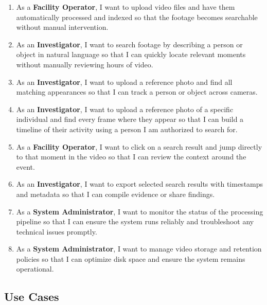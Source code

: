 \begin{enumerate}
    \item As a \textbf{Facility Operator}, I want to upload video files and have them automatically processed and indexed so that the footage becomes searchable without manual intervention.
    \item As an \textbf{Investigator}, I want to search footage by describing a person or object in natural language so that I can quickly locate relevant moments without manually reviewing hours of video.
    \item As an \textbf{Investigator}, I want to upload a reference photo and find all matching appearances so that I can track a person or object across cameras.
    \item As an \textbf{Investigator}, I want to upload a reference photo of a specific individual and find every frame where they appear so that I can build a timeline of their activity using a person I am authorized to search for.
    \item As a \textbf{Facility Operator}, I want to click on a search result and jump directly to that moment in the video so that I can review the context around the event.
    \item As an \textbf{Investigator}, I want to export selected search results with timestamps and metadata so that I can compile evidence or share findings.
    \item As a \textbf{System Administrator}, I want to monitor the status of the processing pipeline so that I can ensure the system runs reliably and troubleshoot any technical issues promptly.
    \item As a \textbf{System Administrator}, I want to manage video storage and retention policies so that I can optimize disk space and ensure the system remains operational.
\end{enumerate}

\subsection{Use Cases}

